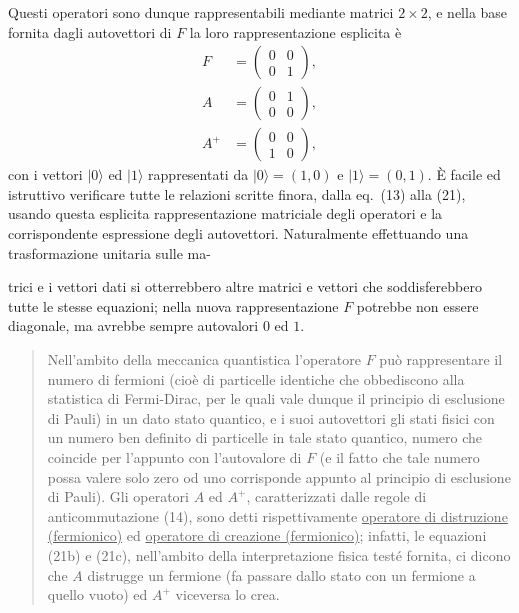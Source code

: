 \documentclass[11pt, a4paper]{book}
\numberwithin{equation}{section}
\begin{document}
Questi operatori sono dunque rappresentabili mediante matrici $2\times2$,
e nella base fornita dagli autovettori di $F$ la loro rappresentazione
esplicita è
\begin{align}
F   &= \begin{pmatrix} 0 & 0 \\ 0 & 1 \end{pmatrix}, \tag{22a} \\[6pt]
A   &= \begin{pmatrix} 0 & 1 \\ 0 & 0 \end{pmatrix}, \tag{22b} \\[6pt]
A^+ &= \begin{pmatrix} 0 & 0 \\ 1 & 0 \end{pmatrix}, \tag{22c}
\end{align}
con i vettori $|0\rangle$ ed $|1\rangle$ rappresentati da
$|0\rangle = (1,0)$ e $|1\rangle = (0,1)$. È facile ed istruttivo
verificare tutte le relazioni scritte finora, dalla eq.\ (13) alla (21),
usando questa esplicita rappresentazione matriciale degli operatori e la
corrispondente espressione degli autovettori. Naturalmente effettuando una
trasformazione unitaria sulle ma-


trici e i vettori dati si otterrebbero altre matrici e vettori che
soddisferebbero tutte le stesse equazioni; nella nuova rappresentazione $F$
potrebbe non essere diagonale, ma avrebbe sempre autovalori $0$ ed $1$.

\begin{quote}
Nell'ambito della meccanica quantistica l'operatore $F$ può rappresentare
il numero di fermioni (cioè di particelle identiche che obbediscono alla
statistica di Fermi-Dirac, per le quali vale dunque il principio di
esclusione di Pauli) in un dato stato quantico, e i suoi autovettori gli
stati fisici con un numero ben definito di particelle in tale stato
quantico, numero che coincide per l'appunto con l'autovalore di $F$ (e il
fatto che tale numero possa valere solo zero od uno corrisponde appunto al
principio di esclusione di Pauli). Gli operatori $A$ ed $A^+$,
caratterizzati dalle regole di anticommutazione (14), sono detti
rispettivamente \underline{operatore di distruzione (fermionico)} ed
\underline{operatore di creazione (fermionico)}; infatti, le equazioni
(21b) e (21c), nell'ambito della interpretazione fisica testé fornita, ci
dicono che $A$ distrugge un fermione (fa passare dallo stato con un
fermione a quello vuoto) ed $A^+$ viceversa lo crea.
\end{quote}
\end{document}
